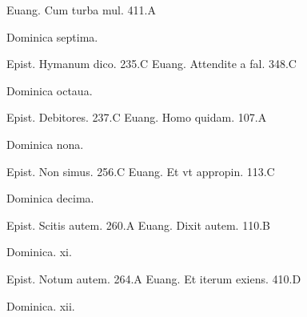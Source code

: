 \documentclass[a5paper,10pt]{book}
\begin{document}
\begin{multicols}{2}
\newline Euang. Cum turba mul. \hfill 411.A
\newline \vspace{-1.75em}
\begin{center}
\color{red} Dominica septima.
\end{center}
\vspace{-.75em}
\par \noindent Epist. Hymanum dico. \hfill 235.C
\newline Euang. Attendite a fal. \hfill 348.C
\newline \vspace{-1.75em}
\begin{center}
\color{red} Dominica octaua.
\end{center}
\vspace{-.75em}
\par \noindent Epist. Debitores. \hfill 237.C
\newline Euang. Homo quidam. \hfill 107.A
\newline \vspace{-1.75em}
\begin{center}
\color{red} Dominica nona.
\end{center}
\vspace{-.75em}
\par \noindent Epist. Non simus. \hfill 256.C
\newline Euang. Et vt appropin. \hfill 113.C
\newline \vspace{-1.75em}
\begin{center}
\color{red} Dominica decima.
\end{center}
\vspace{-.75em}
\par \noindent Epist. Scitis autem. \hfill 260.A
\newline Euang. Dixit autem. \hfill 110.B
\newline \vspace{-1.75em}
\begin{center}
\color{red} Dominica. xi.
\end{center}
\vspace{-.75em}
\par \noindent Epist. Notum autem. \hfill 264.A
\newline Euang. Et iterum exiens. \hfill 410.D
\newline \vspace{-1.75em}
\begin{center}
\color{red} Dominica. xii.

\end{center}
\end{multicols}
\end{document}
